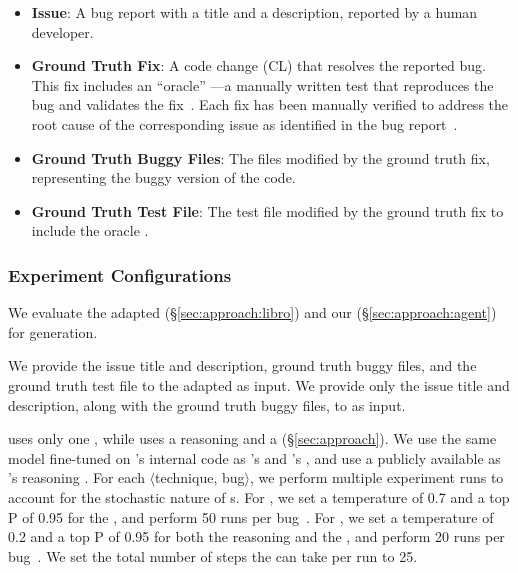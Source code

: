\begin{itemize}
    \item \textbf{\gits Issue}: A bug report with a title and a description, reported by a human developer.
    \item \textbf{Ground Truth Fix}: A code change (CL) that resolves the reported bug. 
    This fix includes an ``oracle'' \brt---a manually written test that reproduces the bug and validates the fix~\cite{frommgen2024resolving}. 
    Each fix has been manually verified to address the root cause of the corresponding issue as identified in the bug report~\cite{rondon2025passerine}.
    \item \textbf{Ground Truth Buggy Files}: The files modified by the ground truth fix, representing the buggy version of the code.
    \item \textbf{Ground Truth Test File}: The test file modified by the ground truth fix to include the oracle \brt.
\end{itemize}



\subsubsection{Experiment Configurations}
We evaluate the adapted \libro (\S\ref{sec:approach:libro}) and our \tool (\S\ref{sec:approach:agent}) for \brt generation.

We provide the \gits issue title and description, ground truth buggy files, and the ground truth test file to the adapted \libro as input. 
We provide only the \gits issue title and description, along with the ground truth buggy files, to \tool as input.

\libro uses only one \llm, while \tool uses a reasoning \llm and a \codeeditingllm (\S\ref{sec:approach}).
We use the same \gemini model fine-tuned on \google's internal code as \libro's \llm and \tool's \codeeditingllm, and use a publicly available \gemini as \tool's reasoning \llm. 
For each $\langle$technique, bug$\rangle$, we perform multiple experiment runs to account for the stochastic nature of \llm{}s. 
For \libro, we set a temperature of 0.7 and a top P of 0.95 for the \llm, and perform 50 runs per bug~\cite{kang2023large}. 
For \tool, we set a temperature of 0.2 and a top P of 0.95 for both the reasoning and the \codeeditingllm, and perform 20 runs per bug~\cite{rondon2025passerine}. 
We set the total number of steps the \tool can take per run to 25. 

